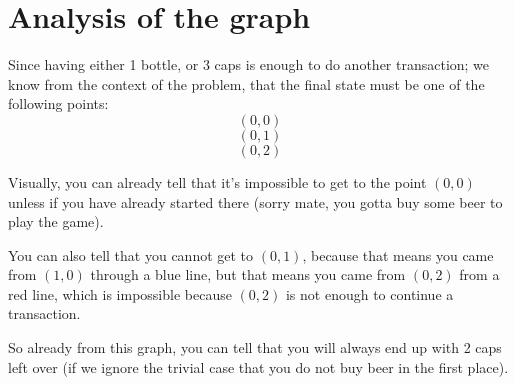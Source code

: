 \documentclass[letterpaper, 12pt]{article}
\begin{document}
\begin{center}
\end{center}
\section{Analysis of the graph}
Since having either 1 bottle, or 3 caps is enough to do another transaction; we know from the context of the problem, that the final state must be one of the following points:
$$(0, 0)$$
$$(0, 1)$$
$$(0, 2)$$

Visually, you can already tell that it's impossible to get to the point $(0, 0)$ unless if you have already started there (sorry mate, you gotta buy some beer to play the game).

You can also tell that you cannot get to $(0, 1)$, because that means you came from $(1, 0)$ through a blue line, but that means you came from $(0, 2)$ from a red line, which is impossible because $(0, 2)$ is not enough to continue a transaction.

So already from this graph, you can tell that you will always end up with 2 caps left over (if we ignore the trivial case that you do not buy beer in the first place).
\end{document}
